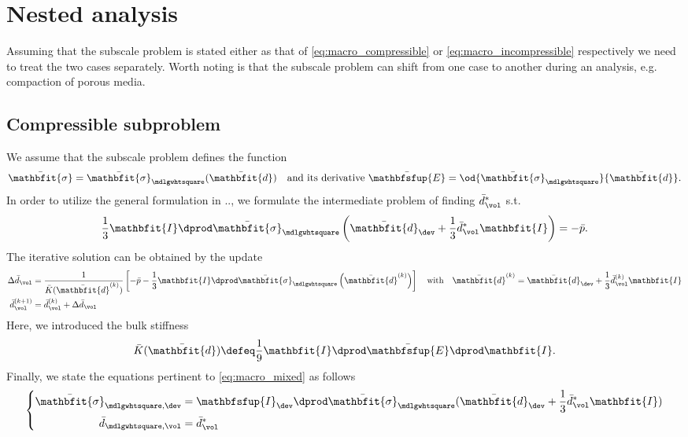 \documentclass[a4paper,11pt]{article}
\renewcommand{\ts}[1]{\mathbfit{#1}}
\renewcommand{\tf}[1]{\mathbfsfup{#1}}
\renewcommand{\Box}{\mdlgwhtsquare}
\begin{document}
\section{Nested analysis}
Assuming that the subscale problem is stated either as that of \eqref{eq:macro_compressible} or \eqref{eq:macro_incompressible} respectively we need to treat the two cases separately.
Worth noting is that the subscale problem can shift from one case to another during an analysis, e.g. compaction of porous media.
\subsection{Compressible subproblem}
We assume that the subscale problem defines the function 
\begin{align}
 \bar{\ts\sigma} = \bar{\ts\sigma}_\Box(\bar{\ts d})\quad \text{and its derivative } \bar{\tf E} = \od{\bar{\ts\sigma}_\Box}{\bar{\ts d}}.
\end{align}
In order to utilize the general formulation in .., we formulate the intermediate problem of finding $\bar{d}_\vol^*$ s.t.
\begin{align}
 \frac13 \ts I\dprod \bar{\ts\sigma}_\Box\left(\bar{\ts d}_\dev + \frac13 \bar{d}_\vol^* \ts I\right) = -\bar p.
\end{align}
The iterative solution can be obtained by the update
\begin{align}
 \Delta\bar{d}_\vol &= \frac{1}{\bar K(\bar{\ts d}^{(k)})} \left[-\bar p - \frac13 \ts I\dprod \bar{\ts\sigma}_\Box\left(\bar{\ts d}^{(k)}\right)\right] \quad \text{with}\quad \bar{\ts d}^{(k)} = \bar{\ts d}_\dev + \frac13 \bar{d}_\vol^{(k)} \ts I\\
 \bar{d}_\vol^{(k+1)} &= \bar{d}_\vol^{(k)} + \Delta\bar{d}_\vol
\end{align}
Here, we introduced the bulk stiffness
\begin{align}
  \bar K(\bar{\ts d}) \defeq \frac19  \ts I\dprod \bar{\tf E} \dprod \ts I.
\end{align}
Finally, we state the equations pertinent to \eqref{eq:macro_mixed} as follows
\begin{align}
 \left\{ \begin{aligned}
         \bar{\ts\sigma}_{\Box,\dev} &= \tf I_\dev \dprod \bar{\ts\sigma}_\Box(\bar{\ts d}_\dev + \frac13 \bar{d}_\vol^* \ts I)\\
         \bar{d}_{\Box,\vol} &= \bar{d}_\vol^*
        \end{aligned}
 \right.
\end{align}
\end{document}
